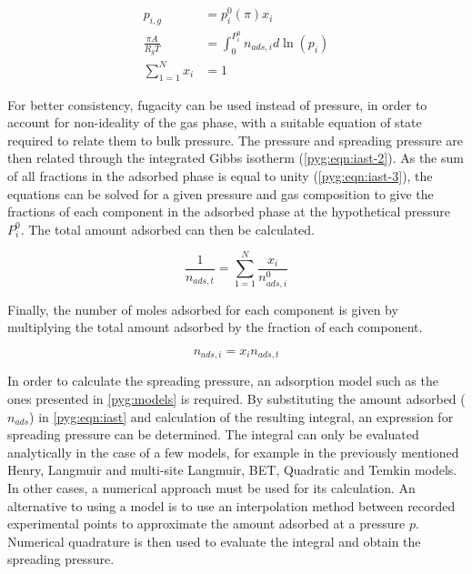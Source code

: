 \begin{align}
    p_{i,g} & = p_i^0(\pi)x_i %
    \label{pyg:eqn:iast} \\
    \frac{\pi A}{R_g T} & = \int_{0}^{P_{i}^{0}} n_{ads,i} d\ln{(p_i)} %
    \label{pyg:eqn:iast-2} \\
    \sum_{1=1}^{N} x_i & = 1 %
    \label{pyg:eqn:iast-3}
\end{align}

For better consistency, fugacity can be used instead of pressure,
in order to account for non-ideality of the gas phase, 
with a suitable equation of state required to relate them to bulk pressure.
The pressure and spreading pressure are then related through 
the integrated Gibbs isotherm (\autoref{pyg:eqn:iast-2}). As the sum of all
fractions in the adsorbed phase is equal to unity (\autoref{pyg:eqn:iast-3}),
the equations can be solved for a given pressure and gas composition to give 
the fractions of each component in the adsorbed phase at the hypothetical
pressure \(P_{i}^{0}\). The total amount adsorbed can then be calculated.

\begin{equation}
    \frac{1}{n_{ads,t}} = \sum_{1=1}^{N} \frac{x_i}{n_{ads,i}^0}
\end{equation}

Finally, the number of moles adsorbed for each component is given 
by multiplying the total amount adsorbed by the fraction of each 
component.

\begin{equation}
    n_{ads, i} = x_i n_{ads,t}
\end{equation}

In order to calculate the spreading pressure, an adsorption model
such as the ones presented in \autoref{pyg:models} is required.
By substituting the amount adsorbed (\(n_{ads}\)) in \autoref{pyg:eqn:iast}
and calculation of the resulting integral, an expression for 
spreading pressure can be determined. The integral can only be 
evaluated analytically in the case of a few models, for example in
the previously mentioned Henry, Langmuir and multi-site Langmuir,
BET, Quadratic and Temkin models. In other cases, a numerical approach
must be used for its calculation. An alternative to using a 
model is to use an interpolation method between recorded experimental
points to approximate the amount adsorbed at a pressure \(p\). Numerical
quadrature is then used to evaluate the integral and obtain the
spreading pressure.